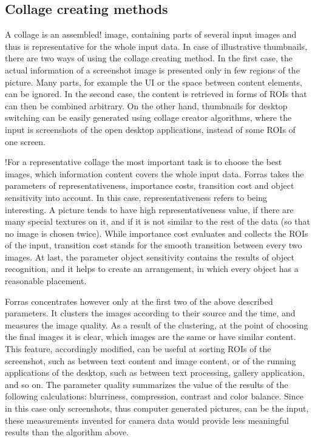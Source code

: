 \documentclass[draft,final]{vutinfth} %
\begin{document}
\subsection{Collage creating methods} 
A collage is an assembled! image, containing parts of several input images and thus is representative for the whole input data.
In case of illustrative thumbnails, there are two ways of using the collage creating method.  
In the first case, the actual information of a screenshot image is presented only in few regions of the picture.
Many parts, for example the UI or the space between content elements, can be ignored. 
In the second case, the content is retrieved in forms of ROIs that can then be combined arbitrary.
On the other hand, thumbnails for desktop switching can be easily generated using collage creator algorithms, where the input is screenshots of the open desktop applications, instead of some ROIs of one screen.\par
!For a representative collage the most important task is to choose the best images, which information content covers the whole input data.
Forras takes the parameters of representativeness, importance costs, transition cost and object sensitivity into account.
In this case, representativeness refers to being interesting.
A picture tends to have high representativeness value, if there are many special textures on it, and if it is not similar to the rest of the data (so that no image is chosen twice).
While importance cost evaluates and collects the ROIs of the input, transition cost stands for the smooth transition between every two images.
At last, the parameter object sensitivity contains the results of object recognition, and it helps to create an arrangement, in which every object has a reasonable placement.\par
Forras concentrates however only at the first two of the above described parameters.
It clusters the images according to their source and the time, and measures the image quality.
As a result of the clustering, at the point of choosing the final images it is clear,  which images are the same or have similar content.
This feature, accordingly modified, can be useful at sorting ROIs of the screenshot, such as between text content and image content, or of the running applications of the desktop, such as between text processing, gallery application, and so on.
The parameter quality summarizes the value of the results of the following calculations: blurriness, compression, contrast and color balance.
Since in this case only screenshots, thus computer generated pictures, can be the input, these measurements invented for camera data would provide less meaningful results than the algorithm above.\par 
\end{document}
